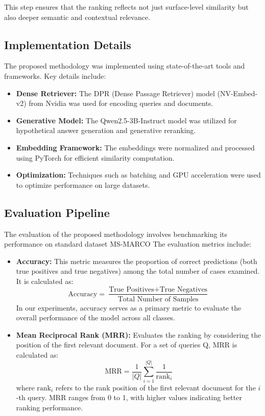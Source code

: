 This step ensures that the ranking reflects not just surface-level similarity but also deeper semantic and contextual relevance.

\subsection{Implementation Details}
The proposed methodology was implemented using state-of-the-art tools and frameworks. Key details include:
\begin{itemize}
    \item \textbf{Dense Retriever:} The DPR (Dense Passage Retriever) model (NV-Embed-v2)\cite{nvembed} from Nvidia was used for encoding queries and documents.
    \item \textbf{Generative Model:} The Qwen2.5-3B-Instruct\cite{qwen2.5} model was utilized for hypothetical answer generation and generative reranking.
    \item \textbf{Embedding Framework:} The embeddings were normalized and processed using PyTorch\cite{pytorch} for efficient similarity computation.
    \item \textbf{Optimization:} Techniques such as batching and GPU acceleration were used to optimize performance on large datasets.
\end{itemize}

\subsection{Evaluation Pipeline}
The evaluation of the proposed methodology involves benchmarking its performance on standard dataset MS-MARCO\cite{DBLP:journals/corr/NguyenRSGTMD16} The evaluation metrics include:
\begin{itemize}
       \item \textbf{Accuracy:} This metric measures the proportion of correct predictions (both true positives and true negatives) among the total number of cases examined. It is calculated as:
    \begin{equation}
        \text{Accuracy} = \frac{\text{True Positives} + \text{True Negatives}}{\text{Total Number of Samples}}
    \end{equation}
    In our experiments, accuracy serves as a primary metric to evaluate the overall performance of the model across all classes.
        \item \textbf{Mean Reciprocal Rank (MRR):} Evaluates the ranking by considering the position of the first relevant document. For a set of queries Q, MRR is calculated as:
    \begin{equation}
        \text{MRR} = \frac{1}{|Q|} \sum_{i=1}^{|Q|} \frac{1}{\text{rank}_i}
    \end{equation}
    where $\text{rank}_i$ refers to the rank position of the first relevant document for the $i$-th query. MRR ranges from 0 to 1, with higher values indicating better ranking performance.
\end{itemize}


